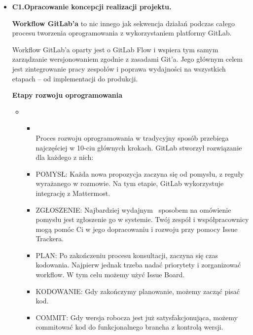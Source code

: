 \documentclass[12pt]{article}
\renewcommand{\_}{\kern-1.5pt\textunderscore\kern-1.5pt}
\begin{document}
\vspace{\baselineskip}\begin{itemize}
	\item \textbf{C1.Opracowanie koncepcji realizacji projektu.}\par

\textbf{Workflow GitLab’a} to nic innego jak sekwencja działań podczas całego procesu tworzenia oprogramowania z wykorzystaniem platformy GitLab.\par

Workflow GitLab’a oparty jest o GitLab Flow i wspiera tym samym zarządzanie wersjonowaniem zgodnie z zasadami Git’a. Jego głównym celem jest zintegrowanie pracy zespołów i poprawa wydajności na wszystkich etapach – od implementacji do produkcji. \par

\textbf{Etapy rozwoju oprogramowania}\par

\begin{itemize}
	\item \begin{itemize}
	\item \tab \\
Proces rozwoju oprogramowania w tradycyjny sposób przebiega najczęściej w 10-ciu głównych krokach. GitLab stworzył rozwiązanie dla każdego z nich:\par

	\item POMYSŁ: Każda nowa propozycja zaczyna się od pomysłu, z reguły wyrażanego w rozmowie. Na tym etapie, GitLab wykorzystuje integrację z Mattermost.\par

	\item ZGŁOSZENIE: Najbardziej wydajnym  sposobem na omówienie pomysłu jest zgłoszenie go w systemie. Twój zespół i współpracownicy mogą pomóc Ci w jego dopracowaniu i rozwoju przy pomocy Issue Trackera. \par

	\item PLAN: Po zakończeniu procesu konsultacji, zaczyna się czas kodowania. Najpierw jednak trzeba nadać priorytety i zorganizować workflow. W tym celu możemy użyć Issue Board.\par

	\item KODOWANIE: Gdy zakończymy planowanie, możemy zacząć pisać kod.\par

	\item COMMIT: Gdy wersja robocza jest już satysfakcjonująca, możemy commitować kod do funkcjonalnego brancha z kontrolą wersji.\par


\end{itemize}
\end{itemize}
\end{itemize}
\end{document}
